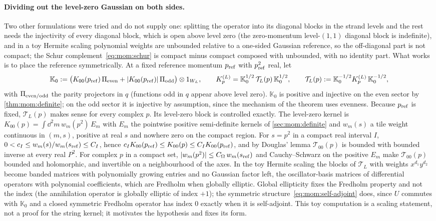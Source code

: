 \paragraph{Dividing out the level-zero Gaussian on both sides.}
Two other formulations were tried and do not supply one: splitting the operator into its diagonal blocks in the strand levels and the rest needs the injectivity of every diagonal block, which is open above level zero (the zero-momentum level-$(1, 1)$ diagonal block is indefinite), and in a toy Hermite scaling polynomial weights are unbounded relative to a one-sided Gaussian reference, so the off-diagonal part is not compact; the Schur complement~\eqref{eq:mom:schur} is compact minus compact composed with unbounded, with no identity part.
What works is to place the reference symmetrically.
At a fixed reference momentum $p_{\rm ref}$ with $p_{\rm ref}^2$ real, let
\begin{equation}
  \label{eq:mom:fredholm-form}
  \mathbb K_0
    := \big( K_{00}(p_{\rm ref}) \, \Pi_{\rm even} + {|K_{00}(p_{\rm ref})|} \, \Pi_{\rm odd} \big) \otimes 1_{W_L},
  \qquad
  K^{(L)}_p
    = \mathbb K_0^{1/2} \, \mathcal T_L(p) \, \mathbb K_0^{1/2},
  \qquad
  \mathcal T_L(p)
    := \mathbb K_0^{-1/2} K^{(L)}_p \, \mathbb K_0^{-1/2},
\end{equation}
with $\Pi_{\rm even / odd}$ the parity projectors in $q$ (functions odd in $q$ appear above level zero).
$\mathbb K_0$ is positive and injective on the even sector by \cref{thm:mom:definite}; on the odd sector it is injective by assumption, since the mechanism of the theorem uses evenness.
Because $p_{\rm ref}$ is fixed, $\mathcal T_L(p)$ makes sense for every complex $p$.
Its level-zero block is controlled exactly.
The level-zero kernel is $K_{00}(p) = \int \dd^2 m \, w_m(p^2) \, E_m$ with $E_m$ the pointwise positive semi-definite kernels of \cref{sec:mom:definite} and $w_m(s)$ a tile weight continuous in $(m, s)$, positive at real $s$ and nowhere zero on the compact region.
For $s = p^2$ in a compact real interval $I$, $0 < c_I \le w_m(s) / w_m(s_{\rm ref}) \le C_I$, hence $c_I K_{00}(p_{\rm ref}) \le K_{00}(p) \le C_I K_{00}(p_{\rm ref})$, and by Douglas' lemma $\mathcal T_{00}(p)$ is bounded with bounded inverse at every real $P^2$.
For complex $p$ in a compact set, ${|w_m(p^2)|} \le C_\Omega \, w_m(s_{\rm ref})$ and Cauchy--Schwarz on the positive $E_m$ make $\mathcal T_{00}(p)$ bounded and holomorphic, and invertible on a neighbourhood of the axes.
In the toy Hermite scaling the blocks of $\mathcal T_L$ with weights $x^{d_1} y^{d_2}$ become banded matrices with polynomially growing entries and no Gaussian factor left, the oscillator-basis matrices of differential operators with polynomial coefficients, which are Fredholm when globally elliptic.
Global ellipticity fixes the Fredholm property and not the index (the annihilation operator is globally elliptic of index $+1$); the symmetric structure~\eqref{eq:mom:self-adjoint} does, since $U$ commutes with $\mathbb K_0$ and a closed symmetric Fredholm operator has index $0$ exactly when it is self-adjoint.
This toy computation is a scaling statement, not a proof for the string kernel; it motivates the hypothesis and fixes its form.


